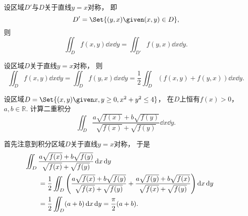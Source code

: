 
设区域\(D'\)与\(D\)关于直线\(y=x\)对称，
即\begin{equation*}
	D' = \Set{ (y,x) \given (x,y) \in D },
\end{equation*}
则\begin{equation*}
	\iint_D f(x,y) \dd{x}\dd{y}
	= \iint_{D'} f(y,x) \dd{x}\dd{y}.
\end{equation*}

设区域\(D\)关于直线\(y=x\)对称，
则\begin{equation*}
	\iint_D f(x,y) \dd{x}\dd{y}
	= \iint_D f(y,x) \dd{x}\dd{y}
	= \frac12 \iint_D (f(x,y) + f(y,x)) \dd{x}\dd{y}.
\end{equation*}

\begin{example}
设区域\(D = \Set{ (x,y) \given x,y\geq0,x^2+y^2\leq4 }\)，
在\(D\)上恒有\(f(x)>0\)，
\(a,b\in\mathbb{R}\).
计算二重积分\begin{equation*}
	\iint_D \frac{a \sqrt{f(x)} + b \sqrt{f(y)}}{\sqrt{f(x)} + \sqrt{f(y)}} \dd{x}\dd{y}.
\end{equation*}
\begin{solution}
首先注意到积分区域\(D\)关于直线\(y=x\)对称，
于是\begin{align*}
	&\hspace{-20pt}
	\iint_D \frac{a \sqrt{f(x)} + b \sqrt{f(y)}}{\sqrt{f(x)} + \sqrt{f(y)}} \dd{x}\dd{y} \\
	&= \frac12 \iint_D \left(
		\frac{a \sqrt{f(x)} + b \sqrt{f(y)}}{\sqrt{f(x)} + \sqrt{f(y)}}
		+ \frac{a \sqrt{f(y)} + b \sqrt{f(x)}}{\sqrt{f(x)} + \sqrt{f(y)}}
	\right) \dd{x}\dd{y} \\
	&= \frac12 \iint_D (a+b) \dd{x}\dd{y}
	= \frac\pi2 (a+b).
\end{align*}
\end{solution}
\end{example}
